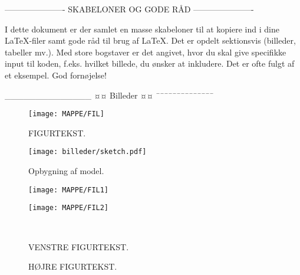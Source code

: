 ----------------------
SKABELONER OG GODE RÅD
----------------------

I dette dokument er der samlet en masse skabeloner til at kopiere ind i dine LaTeX-filer samt gode råd til brug af LaTeX. Det er opdelt sektionsvis (billeder, tabeller mv.). Med store bogstaver er det angivet, hvor du skal give specifikke input til koden, f.eks. hvilket billede, du ønsker at inkludere. Det er ofte fulgt af et eksempel. God fornøjelse!

______________
¤¤ Billeder ¤¤
¯¯¯¯¯¯¯¯¯¯¯¯¯¯

\begin{figure}[htbp] %
	\centering
	\texttt{[image: MAPPE/FIL]}
	\caption{FIGURTEKST.}
	\label{fig:LABEL}
\end{figure}

\begin{figure}[H]
	\centering
	\texttt{[image: billeder/sketch.pdf]}
	\caption{Opbygning af model.}
	\label{fig:sketch}
\end{figure}

\begin{figure}[H]
	\centering
	\begin{minipage}[b]{0.48\textwidth}
	\centering
	\texttt{[image: MAPPE/FIL1]} %
	\end{minipage}
	\hfill
	\begin{minipage}[b]{0.48\textwidth}
	\centering
	\texttt{[image: MAPPE/FIL2]} %
	\end{minipage}
	\\ %
	\begin{minipage}[t]{0.48\textwidth}
	\caption{VENSTRE FIGURTEKST.} %
	\label{fig:LABEL1}
	\end{minipage}
	\hfill
	\begin{minipage}[t]{0.48\textwidth}
	\caption{HØJRE FIGURTEKST.} %
	\label{fig:LABEL2}
	\end{minipage}
\end{figure}

